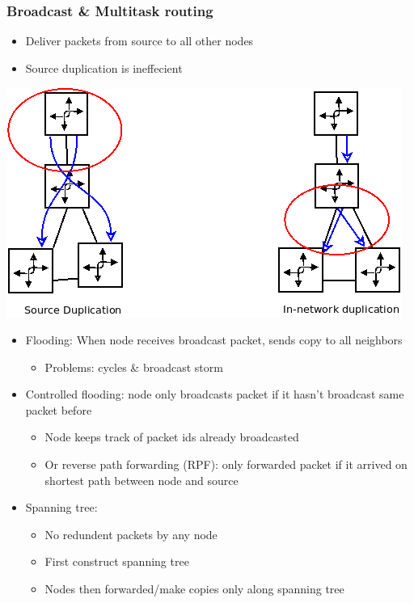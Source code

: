 \documentclass[11pt]{article}
\begin{document}
\subsubsection{Broadcast \& Multitask routing}
\label{sec:org5d68de5}
\begin{itemize}
\item Deliver packets from source to all other nodes
\item Source duplication is ineffecient
\end{itemize}

\begin{center}
\includegraphics[width=.9\linewidth]{../img/broadcastMultitask.png}
\end{center}

\begin{itemize}
\item Flooding: When node receives broadcast packet, sends copy to all
neighbors
\begin{itemize}
\item Problems: cycles \& broadcast storm
\end{itemize}
\item Controlled flooding: node only broadcasts packet if it hasn't
broadcast same packet before
\begin{itemize}
\item Node keeps track of packet ids already broadcasted
\item Or reverse path forwarding (RPF): only forwarded packet if it
arrived on shortest path between node and source
\end{itemize}

\item Spanning tree:
\begin{itemize}
\item No redundent packets by any node

\item First construct spanning tree

\item Nodes then forwarded/make copies only along spanning tree
\end{itemize}
\end{itemize}
\end{document}
